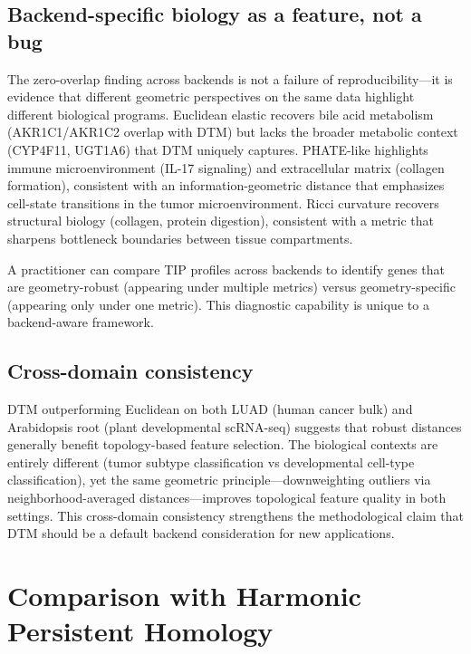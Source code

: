 \documentclass[11pt]{article}
\begin{document}
\subsection{Backend-specific biology as a feature, not a bug}

The zero-overlap finding across backends is not a failure of reproducibility---it is evidence that different geometric perspectives on the same data highlight different biological programs.
Euclidean elastic recovers bile acid metabolism (AKR1C1/AKR1C2 overlap with DTM) but lacks the broader metabolic context (CYP4F11, UGT1A6) that DTM uniquely captures.
PHATE-like highlights immune microenvironment (IL-17 signaling) and extracellular matrix (collagen formation), consistent with an information-geometric distance that emphasizes cell-state transitions in the tumor microenvironment.
Ricci curvature recovers structural biology (collagen, protein digestion), consistent with a metric that sharpens bottleneck boundaries between tissue compartments.

A practitioner can compare TIP profiles across backends to identify genes that are geometry-robust (appearing under multiple metrics) versus geometry-specific (appearing only under one metric).
This diagnostic capability is unique to a backend-aware framework.

\subsection{Cross-domain consistency}

DTM outperforming Euclidean on both LUAD (human cancer bulk) and Arabidopsis root (plant developmental scRNA-seq) suggests that robust distances generally benefit topology-based feature selection.
The biological contexts are entirely different (tumor subtype classification vs developmental cell-type classification), yet the same geometric principle---downweighting outliers via neighborhood-averaged distances---improves topological feature quality in both settings.
This cross-domain consistency strengthens the methodological claim that DTM should be a default backend consideration for new applications.

\section{Comparison with Harmonic Persistent Homology}
\label{sec:comparison}
\end{document}
